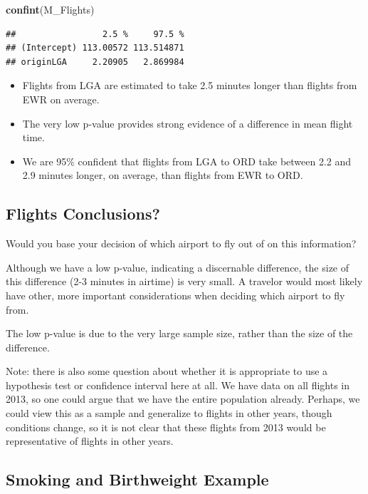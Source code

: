 \documentclass[]{book}
\newenvironment{Shaded}{\begin{snugshade}}{\end{snugshade}}
\newcommand{\KeywordTok}[1]{\textcolor[rgb]{0.13,0.29,0.53}{\textbf{#1}}}
\newcommand{\NormalTok}[1]{#1}
\begin{document}
\begin{Shaded}
\begin{Highlighting}[]
\KeywordTok{confint}\NormalTok{(M_Flights)}
\end{Highlighting}
\end{Shaded}

\begin{verbatim}
##                 2.5 %     97.5 %
## (Intercept) 113.00572 113.514871
## originLGA     2.20905   2.869984
\end{verbatim}

\begin{itemize}
\item
  Flights from LGA are estimated to take 2.5 minutes longer than flights
  from EWR on average.
\item
  The very low p-value provides strong evidence of a difference in mean
  flight time.
\item
  We are 95\% confident that flights from LGA to ORD take between 2.2
  and 2.9 minutes longer, on average, than flights from EWR to ORD.
\end{itemize}

\subsection{Flights Conclusions?}\label{flights-conclusions}

Would you base your decision of which airport to fly out of on this
information?

Although we have a low p-value, indicating a discernable difference, the
size of this difference (2-3 minutes in airtime) is very small. A
travelor would most likely have other, more important considerations
when deciding which airport to fly from.

The low p-value is due to the very large sample size, rather than the
size of the difference.

Note: there is also some question about whether it is appropriate to use
a hypothesis test or confidence interval here at all. We have data on
all flights in 2013, so one could argue that we have the entire
population already. Perhaps, we could view this as a sample and
generalize to flights in other years, though conditions change, so it is
not clear that these flights from 2013 would be representative of
flights in other years.

\subsection{Smoking and Birthweight
Example}\label{smoking-and-birthweight-example}
\end{document}
